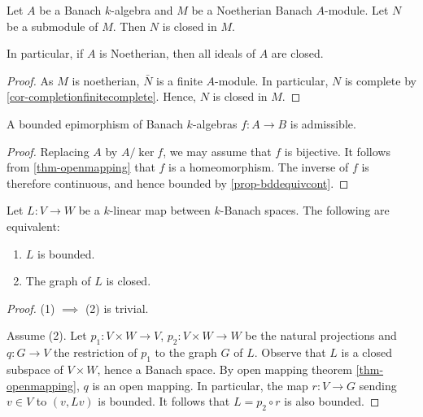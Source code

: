 \begin{corollary}\label{cor-idealclosed}
    Let $A$ be a Banach $k$-algebra and $M$ be a Noetherian Banach $A$-module. Let $N$ be a submodule of $M$. Then $N$ is closed in $M$.
    
    In particular, if $A$ is Noetherian, then all ideals of $A$ are closed.
\end{corollary}
\begin{proof}
    As $M$ is noetherian, $\bar{N}$ is a finite $A$-module. In particular, $N$ is complete by \cref{cor-completionfinitecomplete}. Hence, $N$ is closed in $M$.
\end{proof}

\begin{corollary}\label{cor-bddisadmi}
    A bounded epimorphism of Banach $k$-algebras $f:A\rightarrow B$ is admissible.
\end{corollary}
\begin{proof}
    Replacing $A$ by $A/\ker f$, we may assume that $f$ is bijective. It follows from \cref{thm-openmapping} that $f$ is a homeomorphism. The inverse of $f$ is therefore continuous, and hence bounded by \cref{prop-bddequivcont}.
\end{proof}


\begin{corollary}\label{cor-closedgraph}
    Let $L:V\rightarrow W$ be a $k$-linear map between $k$-Banach spaces. The following are equivalent:
    \begin{enumerate}
        \item $L$ is bounded.
        \item The graph of $L$ is closed.
    \end{enumerate}
\end{corollary}
\begin{proof}
    (1) $\implies$ (2) is trivial.

    Assume (2). Let $p_1:V\times W\rightarrow V$, $p_2:V\times W\rightarrow W$ be the natural projections and $q:G\rightarrow V$ the restriction of $p_1$ to the graph $G$ of $L$. Observe that $L$ is a closed subspace of $V\times W$, hence a Banach space. By open mapping theorem \cref{thm-openmapping}, $q$ is an open mapping. In particular, the map $r:V\rightarrow G$ sending $v\in V$ to $(v,Lv)$ is bounded. It follows that $L=p_2\circ r$ is also bounded.
\end{proof}

